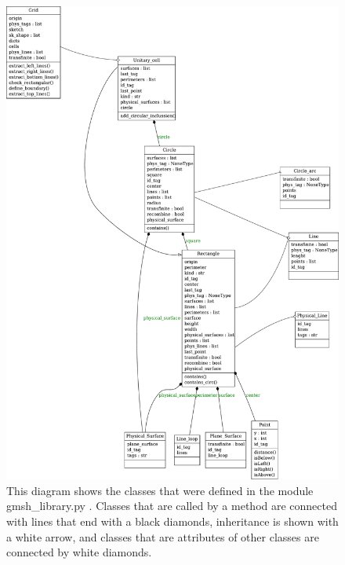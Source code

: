 \begin{figure}
\centering
\includegraphics[scale=0.33]{./img/gmsh_library.pdf}
\caption{This diagram shows the classes that were defined in the module gmsh\_library.py . Classes that are called by a method are connected with lines that end with a black diamonds, inheritance is shown with a white arrow, and classes that are attributes of other classes are connected by white diamonds.}
\label{fig:gmsh_library_classes}
\end{figure}

